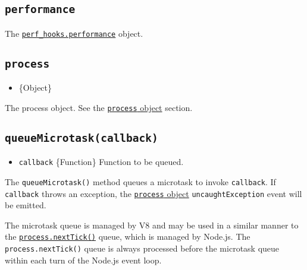 \subsection{\texorpdfstring{\texttt{performance}}{performance}}\label{performance}

The
\href{perf_hooks.md\#perf_hooksperformance}{\texttt{perf\_hooks.performance}}
object.

\subsection{\texorpdfstring{\texttt{process}}{process}}\label{process}

\begin{itemize}
\tightlist
\item
  \{Object\}
\end{itemize}

The process object. See the \href{process.md\#process}{\texttt{process}
object} section.

\subsection{\texorpdfstring{\texttt{queueMicrotask(callback)}}{queueMicrotask(callback)}}\label{queuemicrotaskcallback}

\begin{itemize}
\tightlist
\item
  \texttt{callback} \{Function\} Function to be queued.
\end{itemize}

The \texttt{queueMicrotask()} method queues a microtask to invoke
\texttt{callback}. If \texttt{callback} throws an exception, the
\href{process.md\#process}{\texttt{process} object}
\texttt{\textquotesingle{}uncaughtException\textquotesingle{}} event
will be emitted.

The microtask queue is managed by V8 and may be used in a similar manner
to the
\href{process.md\#processnexttickcallback-args}{\texttt{process.nextTick()}}
queue, which is managed by Node.js. The \texttt{process.nextTick()}
queue is always processed before the microtask queue within each turn of
the Node.js event loop.

